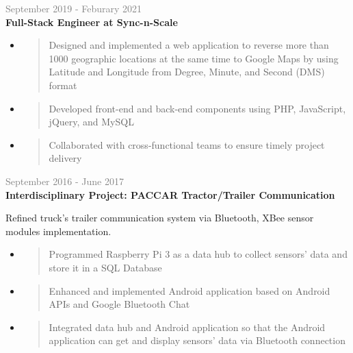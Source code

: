\documentclass[letterpage]{article}
\begin{document}
\begin{minipage}[t]{0.61\linewidth}
\vspace{7px}
\textcolor{gray}{September 2019 - Feburary 2021}\\
\textbf{\textsf{Full-Stack Engineer at Sync-n-Scale}}
\begin{itemize}[leftmargin=*,labelindent=1mm,labelsep=0mm]
\item
  \begin{quote}
  \raggedright
  Designed and implemented a web application to reverse more than 1000 geographic locations at the same time to Google Maps by using Latitude and Longitude from Degree, Minute, and Second (DMS) format
  \end{quote}
\item
  \begin{quote}
  \raggedright
  Developed front-end and back-end components using PHP, JavaScript, jQuery, and MySQL
  \end{quote}
\item
  \begin{quote}
  \raggedright
  Collaborated with cross-functional teams to ensure timely project delivery
  \end{quote}
\end{itemize}

\vspace{7px}
\textcolor{gray}{September 2016 - June 2017}
\quad 
\\
\textbf{\textsf{Interdisciplinary Project:
PACCAR Tractor/Trailer Communication}}\\
\raggedright
Refined truck’s trailer communication system via Bluetooth, XBee sensor modules implementation.\\
\begin{itemize}[leftmargin=*,labelindent=1mm,labelsep=0mm]
\item
  \begin{quote}
  \raggedright
  Programmed Raspberry Pi 3 as a data hub to collect sensors' data and store it in a SQL Database
  \end{quote}
\item
  \begin{quote}
  \raggedright
  Enhanced and implemented Android application based on Android APIs and Google Bluetooth Chat
  \end{quote}
\item
  \begin{quote}
  \raggedright
  Integrated data hub and Android application so that the Android application can get and display sensors' data via Bluetooth connection
  \end{quote}
\end{itemize}
\end{minipage}
\end{document}
